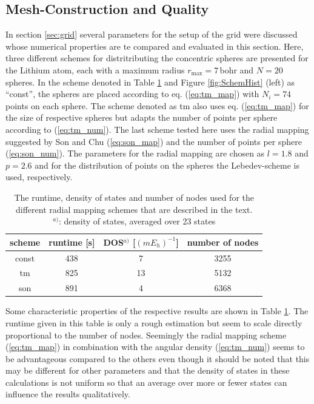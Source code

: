 \subsection{Mesh-Construction and Quality}
\label{sec:NumConve}
In section \ref{sec:grid} several parameters for the setup of the grid were discussed whose numerical properties are te compared and evaluated in this section.
Here, three different schemes for distritributing the concentric spheres are presented for the Lithium atom, each with a maximum radius $r_\text{max}=7\,$bohr and $N=20$ spheres.
In the scheme denoted in Table \ref{tab:RadScheme} and Figure \ref{fig:SchemHist} (left) as ``const'', the spheres are placed according to eq. (\ref{eq:tm_map}) with $N_i=74$ points on each sphere.
The scheme denoted as tm also uses eq. (\ref{eq:tm_map}) for the size of respective spheres but adapts the number of points per sphere according to (\ref{eq:tm_num}).
The last scheme tested here uses the radial mapping suggested by Son and Chu \cite{Son_Chu0} (\ref{eq:son_map}) and the number of points per sphere (\ref{eq:son_num}).
The parameters for the radial mapping are chosen as $l=1.8$ and $p=2.6$ and for the distribution of points on the spheres the Lebedev-scheme \cite{lebedev} is used, respectively.
\begin{table}
\begin{tabular}{|c|c|c|c|}
\hline
scheme & runtime [s] & DOS$^{a)}$ [$(m E_h)^{-1}$] & number of nodes\\
\hline
const   &  438   &    7    &   3255 \\
tm      &  825   &    13   &   5132 \\
son     &  891   &    4    &   6368 \\
\hline
\end{tabular}
\caption{The runtime, density of states and number of nodes used for the different radial mapping schemes that are described in the text.\\
$^{a)}$: density of states, averaged over 23 states}
\label{tab:RadScheme}
\end{table}
Some characteristic properties of the respective results are shown in Table \ref{tab:RadScheme}.
The runtime given in this table is only a rough estimation but seem to scale directly proportional to the number of nodes.
Seemingly the radial mapping scheme (\ref{eq:tm_map}) in combination with the angular density (\ref{eq:tm_num}) seems to be advantageous compared to the others even though it should be noted that this may be different for other parameters and that the density of states in these calculations is not uniform so that an average over more or fewer states can influence the results qualitatively.
